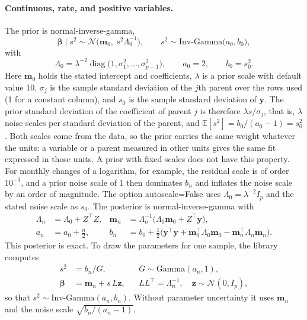 \documentclass[12pt]{article}
\newcommand{\code}[1]{{\ttfamily\def\_{\textunderscore\allowbreak}#1}}
\theoremstyle{plain}
\theoremstyle{definition}
\begin{document}
\paragraph{Continuous, rate, and positive variables.}
The prior is normal-inverse-gamma,
\begin{equation}\label{eq:nigprior}
    \boldsymbol\beta\mid s^2\sim\mathcal{N}\bigl(\mathbf{m}_0,\ s^2\Lambda_0^{-1}\bigr),\qquad s^2\sim\text{Inv-Gamma}\bigl(a_0,b_0\bigr),
\end{equation}
with
\begin{equation}\label{eq:autoscale}
    \Lambda_0=\lambda^{-2}\operatorname{diag}\bigl(1,\sigma_1^2,\dots,\sigma_{p-1}^2\bigr),\qquad a_0=2,\qquad b_0=s_0^2.
\end{equation}
Here $\mathbf{m}_0$ holds the stated intercept and coefficients, $\lambda$ is a prior scale with default value 10, $\sigma_j$ is the sample standard deviation of the $j$th parent over the rows used (1 for a constant column), and $s_0$ is the sample standard deviation of $\mathbf{y}$. The prior standard deviation of the coefficient of parent $j$ is therefore $\lambda s/\sigma_j$, that is, $\lambda$ noise scales per standard deviation of the parent, and $\mathbb{E}[s^2]=b_0/(a_0-1)=s_0^2$. Both scales come from the data, so the prior carries the same weight whatever the units: a variable or a parent measured in other units gives the same fit expressed in those units. A prior with fixed scales does not have this property. For monthly changes of a logarithm, for example, the residual scale is of order $10^{-3}$, and a prior noise scale of 1 then dominates $b_n$ and inflates the noise scale by an order of magnitude. The option \code{autoscale=False} uses $\Lambda_0=\lambda^{-2}I_p$ and the stated noise scale as $s_0$. The posterior is normal-inverse-gamma with~\cite{gelman2013bda}
\begin{align}
    \Lambda_n&=\Lambda_0+Z^{\top}Z, &
    \mathbf{m}_n&=\Lambda_n^{-1}\bigl(\Lambda_0\mathbf{m}_0+Z^{\top}\mathbf{y}\bigr), \label{eq:nigpost1}\\
    a_n&=a_0+\tfrac{n}{2}, &
    b_n&=b_0+\tfrac12\bigl(\mathbf{y}^{\top}\mathbf{y}+\mathbf{m}_0^{\top}\Lambda_0\mathbf{m}_0-\mathbf{m}_n^{\top}\Lambda_n\mathbf{m}_n\bigr). \label{eq:nigpost2}
\end{align}
This posterior is exact. To draw the parameters for one sample, the library computes
\begin{align*}
    s^2&=b_n/G, && G\sim\text{Gamma}(a_n,1),\\
    \boldsymbol\beta&=\mathbf{m}_n+s\,L\mathbf{z}, && LL^{\top}=\Lambda_n^{-1},\quad \mathbf{z}\sim\mathcal{N}(0,I_p),
\end{align*}
so that $s^2\sim\text{Inv-Gamma}(a_n,b_n)$. Without parameter uncertainty it uses $\mathbf{m}_n$ and the noise scale $\sqrt{b_n/(a_n-1)}$.
\end{document}
